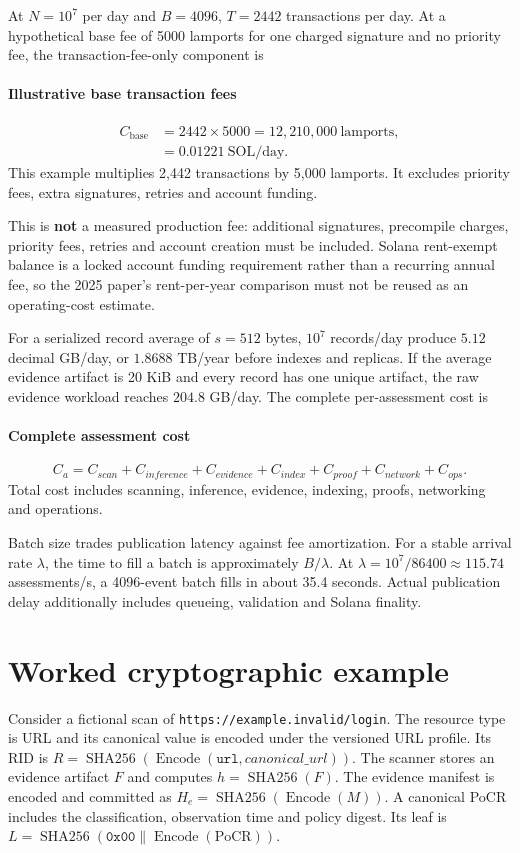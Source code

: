 \documentclass[10pt,a4paper]{article}
\begin{document}
At \(N=10^7\) per day and \(B=4096\), \(T=2442\) transactions per day. At a hypothetical base fee of 5000 lamports for one charged signature and no priority fee, the transaction-fee-only component is


\paragraph{Illustrative base transaction fees}
\[\begin{aligned}C_{\mathrm{base}}&=2442\times5000=12{,}210{,}000\ \mathrm{lamports},\\&=0.01221\ \mathrm{SOL/day}.\end{aligned}\]
This example multiplies 2,442 transactions by 5,000 lamports. It excludes priority fees, extra signatures, retries and account funding.


This is \textbf{not} a measured production fee: additional signatures, precompile charges, priority fees, retries and account creation must be included. Solana rent-exempt balance is a locked account funding requirement rather than a recurring annual fee, so the 2025 paper's rent-per-year comparison must not be reused as an operating-cost estimate.


For a serialized record average of \(s=512\) bytes, \(10^7\) records/day produce \(5.12\) decimal GB/day, or \(1.8688\) TB/year before indexes and replicas. If the average evidence artifact is 20 KiB and every record has one unique artifact, the raw evidence workload reaches \(204.8\) GB/day. The complete per-assessment cost is


\paragraph{Complete assessment cost}
\[C_a=C_{scan}+C_{inference}+C_{evidence}+C_{index}+C_{proof}+C_{network}+C_{ops}.\]
Total cost includes scanning, inference, evidence, indexing, proofs, networking and operations.


Batch size trades publication latency against fee amortization. For a stable arrival rate \(\lambda\), the time to fill a batch is approximately \(B/\lambda\). At \(\lambda=10^7/86400\approx115.74\) assessments/s, a 4096-event batch fills in about 35.4 seconds. Actual publication delay additionally includes queueing, validation and Solana finality.


\section*{Worked cryptographic example}
Consider a fictional scan of \texttt{https://example.invalid/login}. The resource type is URL and its canonical value is encoded under the versioned URL profile. Its RID is \(R=\operatorname{SHA256}(\operatorname{Encode}(\mathtt{url},canonical\_url))\). The scanner stores an evidence artifact \(F\) and computes \(h=\operatorname{SHA256}(F)\). The evidence manifest is encoded and committed as \(H_e=\operatorname{SHA256}(\operatorname{Encode}(M))\). A canonical PoCR includes the classification, observation time and policy digest. Its leaf is \(L=\operatorname{SHA256}(\mathtt{0x00}\parallel\operatorname{Encode}(\mathrm{PoCR}))\).
\end{document}
